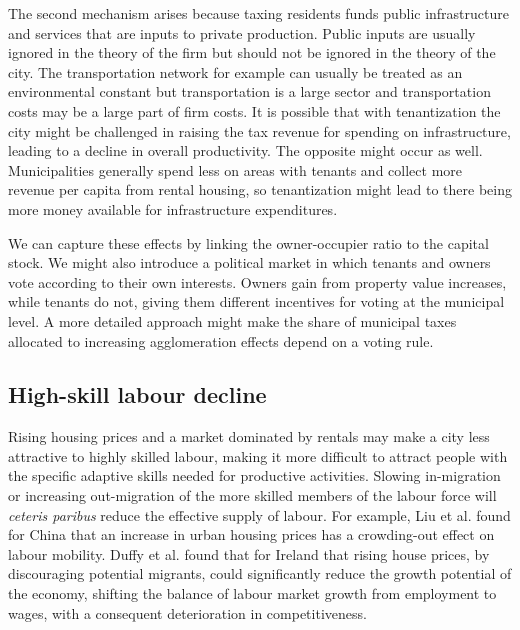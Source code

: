The second mechanism arises because taxing residents funds public infrastructure and services that are inputs to private production. Public inputs are usually ignored in the theory of the firm but should not be ignored in the theory of the city.   The transportation network for example can usually be treated as an environmental constant but transportation is a large sector and transportation costs may be a large part of firm costs. It is possible that with tenantization the city might be challenged in raising the tax revenue for spending on infrastructure, leading to a decline in overall productivity. The opposite might occur as well. Municipalities generally spend less on areas with tenants and collect more revenue per capita from rental housing, so tenantization might lead to there being more money available for %
infrastructure expenditures. 

We can capture these effects by linking the owner-occupier ratio to the capital stock. We might also introduce a political market in which tenants and owners vote according to their own interests. Owners gain from property value increases, while tenants do not, giving them different incentives for voting at the municipal level.   A more detailed approach might make the share of municipal taxes allocated to increasing agglomeration effects depend on a voting rule.


\subsection{High-skill labour decline}

Rising housing prices and a market dominated by rentals may make a city less attractive to highly skilled labour, making it more difficult to attract people with the specific adaptive skills needed for productive activities. %
Slowing in-migration or increasing out-migration of the more skilled members of the labour force will \textit{ceteris paribus} reduce the effective supply of labour. 
For example, Liu et al. \cite{liuImpactUrbanHousing2023} found for China that an increase in urban housing prices has a crowding-out effect on labour mobility.  Duffy et al.  \cite{duffyRisingHousePrices2005} found that for Ireland that rising house prices, by discouraging potential migrants, could significantly reduce the growth potential of the economy, shifting the balance of labour market growth from employment to wages, with a consequent deterioration in competitiveness. %


